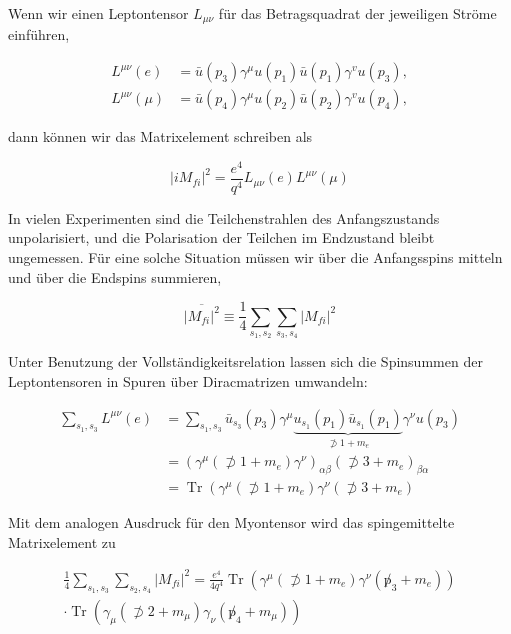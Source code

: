 \documentclass[10pt, letterpaper]{article}
\begin{document}
Wenn wir einen Leptontensor $L_{\mu \nu}$ für das Betragsquadrat der jeweiligen Ströme einführen,

$$
\begin{aligned}
L^{\mu \nu}(e) & =\bar{u}\left(p_{3}\right) \gamma^{\mu} u\left(p_{1}\right) \bar{u}\left(p_{1}\right) \gamma^{v} u\left(p_{3}\right), \\
L^{\mu \nu}(\mu) & =\bar{u}\left(p_{4}\right) \gamma^{\mu} u\left(p_{2}\right) \bar{u}\left(p_{2}\right) \gamma^{v} u\left(p_{4}\right),
\end{aligned}
$$

dann können wir das Matrixelement schreiben als

$$
\left|i M_{f i}\right|^{2}=\frac{e^{4}}{q^{4}} L_{\mu \nu}(e) L^{\mu \nu}(\mu)
$$

In vielen Experimenten sind die Teilchenstrahlen des Anfangszustands unpolarisiert, und die Polarisation der Teilchen im Endzustand bleibt ungemessen. Für eine solche Situation müssen wir über die Anfangsspins mitteln und über die Endspins summieren,

$$
\overline{\left|M_{f i}\right|^{2}} \equiv \frac{1}{4} \sum_{s_{1}, s_{2}} \sum_{s_{3}, s_{4}}\left|M_{f i}\right|^{2}
$$

Unter Benutzung der Vollständigkeitsrelation lassen sich die Spinsummen der Leptontensoren in Spuren über Diracmatrizen umwandeln:

$$
\begin{aligned}
\sum_{s_{1}, s_{3}} L^{\mu \nu}(e) & =\sum_{s_{1}, s_{3}} \bar{u}_{s_{3}}\left(p_{3}\right) \gamma^{\mu} \underbrace{u_{s_{1}}\left(p_{1}\right) \bar{u}_{s_{1}}\left(p_{1}\right)}_{\not \supset 1+m_{e}} \gamma^{\nu} u\left(p_{3}\right) \\
& =\left(\gamma^{\mu}\left(\not \supset 1+m_{e}\right) \gamma^{\nu}\right)_{\alpha \beta}\left(\not \supset 3+m_{e}\right)_{\beta \alpha} \\
& =\operatorname{Tr}\left(\gamma^{\mu}\left(\not \supset 1+m_{e}\right) \gamma^{\nu}\left(\not \supset 3+m_{e}\right)\right.
\end{aligned}
$$

Mit dem analogen Ausdruck für den Myontensor wird das spingemittelte Matrixelement zu

$$
\begin{array}{r}
\frac{1}{4} \sum_{s_{1}, s_{3}} \sum_{s_{2}, s_{4}}\left|M_{f i}\right|^{2}=\frac{e^{4}}{4 q^{4}} \operatorname{Tr}\left(\gamma^{\mu}\left(\not \supset 1+m_{e}\right) \gamma^{\nu}\left(\not p_{3}+m_{e}\right)\right) \\
\cdot \operatorname{Tr}\left(\gamma_{\mu}\left(\not \supset 2+m_{\mu}\right) \gamma_{\nu}\left(\not p_{4}+m_{\mu}\right)\right)
\end{array}
$$
\end{document}
